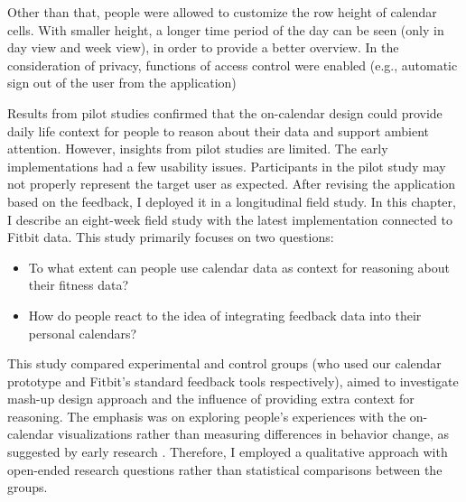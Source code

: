 \documentclass[12pt,oneside]{book}
\begin{document}
Other than that, people were allowed to customize the row height of calendar cells. With smaller height, a longer time period of the day can be seen (only in day view and week view), in order to provide a better overview. In the consideration of privacy, functions of access control were enabled (e.g., automatic sign out of the user from the application)



\label{chap:field study}
Results from pilot studies confirmed that the on-calendar design could provide daily life context for people to reason about their data and support ambient attention. However, insights from pilot studies are limited. The early implementations had a few usability issues. Participants in the pilot study may not properly represent the target user as expected. After revising the application based on the feedback, I deployed it in a longitudinal field study. In this chapter, I describe an eight-week field study with the latest implementation connected to Fitbit data. This study primarily focuses on two questions: 
\begin{itemize}
	\item{To what extent can people use calendar data as context for reasoning about their fitness data?}
	\item{How do people react to the idea of integrating feedback data into their personal calendars?}
\end{itemize}

This study compared experimental and control groups (who used our calendar prototype and Fitbit's standard feedback tools respectively), aimed to investigate mash-up design approach and the influence of providing extra context for reasoning. The emphasis was on exploring people's experiences with the on-calendar visualizations rather than measuring differences in behavior change, as suggested by early research \cite{strengers_designing_2011,pierce_consideration_2010,costanza_understanding_2012, klasnja_how_2011}. Therefore, I employed a qualitative approach with open-ended research questions rather than statistical comparisons between the groups.
\end{document}
